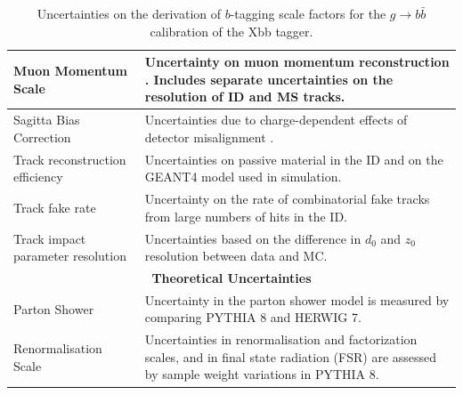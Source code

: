 \documentclass[10pt,a4paper]{book}
\begin{document}
\begin{table}[hbtp]
\begin{tabular}{|l|p{8.5cm}|}
        \hline
        Muon Momentum Scale & Uncertainty on muon momentum reconstruction \cite{ATLAS:2016lqx}. Includes separate uncertainties on the resolution of ID and MS tracks. \\
        \hline
        Sagitta Bias Correction & Uncertainties due to charge-dependent effects of detector misalignment \cite{ATLAS:2016lqx}. \\
        \hline
        Track reconstruction efficiency & Uncertainties on passive material in the ID and on the GEANT4 model used in simulation. \\
        \hline
        Track fake rate & Uncertainty on the rate of combinatorial fake tracks from large numbers of hits in the ID. \\
        \hline
        Track impact parameter resolution & Uncertainties based on the difference in $d_0$ and $z_0$ resolution between data and MC. \\
        \hline
        \multicolumn{2}{|c|}{\textbf{Theoretical Uncertainties}} \\
        \hline
        Parton Shower & Uncertainty in the parton shower model is measured by comparing PYTHIA 8 and HERWIG 7. \\
        \hline
        Renormalisation Scale & Uncertainties in renormalisation and factorization scales, and in final state radiation (FSR) are assessed by sample weight variations in PYTHIA 8. \\
        \hline
    \end{tabular}
    \caption{Uncertainties on the derivation of $b$-tagging scale factors for the $g\rightarrow b\bar{b}$ calibration of the Xbb tagger.}
    \label{tab:uncertainties_cat}
\end{table}
\end{document}
